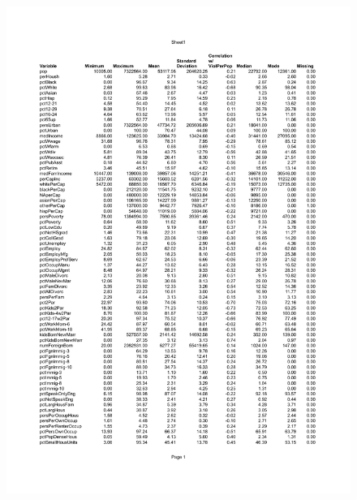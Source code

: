 \documentclass[a4paper,10pt]{article}
\begin{document}
\begin{figure}
\centering
\includegraphics[h, width=1.3\textwidth]{sumstat1.pdf}
\end{figure}
\end{document}
